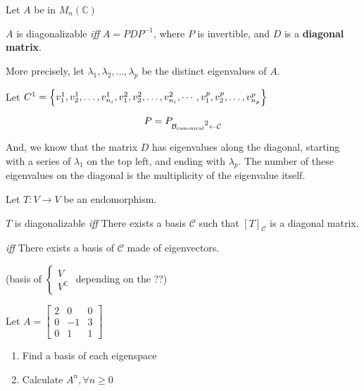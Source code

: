 \begin{theorem}
	Let $A$ be in $M_n(\mathbb{C})$ 
	
	$A$ is diagonalizable \textit{iff} $A = PDP^{-1}$, where $P$ is invertible, and $D$ is a \textbf{diagonal matrix}.

	More precisely, let $\lambda_1, \lambda_2, \ldots, \lambda_p$ be the distinct eigenvalues of $A$.

	Let $C\footnotemark = \left\{v_1^1, v_2^1, \ldots, v_{n_i}^1, v_1^2, v_2^2, \ldots, v_{n_i}^2, \cdots, v_1^p, v_2^p, \ldots, v_{n_p}^p\right\}$

	\[P = P_{\mathcal{B}_{\mathrm{canonical}}\footnotemark\leftarrow \mathcal{C}}\]

	And, we know that the matrix $D$ has eigenvalues along the diagonal, starting with a series of $\lambda_1$ on the top left, and ending with $\lambda_p$. The number of these eigenvalues on the diagonal is the multiplicity of the eigenvalue itself.
\end{theorem}

\begin{theorem}
	Let $T:V \to V$ be an endomorphism.

	$T$ is diagonalizable \textit{iff} There exists a basis $\mathcal{C}$ such that $[T]_{\mathcal{C}}$ is a diagonal matrix.

	\textit{iff} There exists a basis of $\mathcal{C}$ made of eigenvectors.

	(basis of $\begin{cases} V\\V^\mathbb{C}\end{cases}$ depending on the ??)
\end{theorem}

\begin{example}
	Let $A = \begin{bmatrix}
		2&0&0\\0&-1&3\\0&1&1
	\end{bmatrix}$

	\begin{enumerate}
		\item Find a basis of each eigenspace
		\item Calculate $A^n, \forall n \geq 0$
	\end{enumerate}
\end{example}

